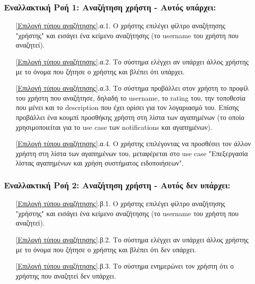 \documentclass[12pt,a4paper]{article}
\begin{document}
\subsubsection*{Εναλλακτική Ροή 1: Αναζήτηση χρήστη - Αυτός υπάρχει:}
\begin{enumerate}
    \item[\ref{Επιλογή τύπου αναζήτησης}.α.1.] Ο χρήστης επιλέγει φίλτρο αναζήτησης "χρήστης" και εισάγει ένα κείμενο αναζήτησης (το username του χρήστη που αναζητεί).
    \item[\ref{Επιλογή τύπου αναζήτησης}.α.2.] Το σύστημα ελέγχει αν υπάρχει άλλος χρήστης με το όνομα που ζήτησε ο χρήστης και βλέπει ότι υπάρχει.
    \item[\ref{Επιλογή τύπου αναζήτησης}.α.3.] Το σύστημα προβάλλει στον χρήστη το προφίλ του χρήστη που αναζήτησε, δηλαδή το username, το rating του, την τοποθεσία που μένει και το description που έχει ορίσει για τον λογαριασμό του. Επίσης προβάλλει ένα κουμπί προσθήκης χρήστη στη λίστα των αγαπημένων (το οποίο χρησιμοποιείται για το use case των notifications και αγαπημένων).
    \item[\ref{Επιλογή τύπου αναζήτησης}.α.4.] Ο χρήστης επιλέγοντας να προσθέσει τον άλλον χρήστη στη λίστα των αγαπημένων του, μεταφέρεται στο use case "Επεξεργασία λίστας αγαπημένων και χρήση συστήματος ειδοποιήσεων".
\end{enumerate}

\subsubsection*{Εναλλακτική Ροή 2: Αναζήτηση χρήστη - Αυτός δεν υπάρχει:}
\begin{enumerate}
    \item[\ref{Επιλογή τύπου αναζήτησης}.β.1.] Ο χρήστης επιλέγει φίλτρο αναζήτησης "χρήστης" και εισάγει ένα κείμενο αναζήτησης (το username του χρήστη που αναζητεί).
    \item[\ref{Επιλογή τύπου αναζήτησης}.β.2.] Το σύστημα ελέγχει αν υπάρχει άλλος χρήστης με το όνομα που ζήτησε ο χρήστης και βλέπει ότι δεν υπάρχει.
    \item[\ref{Επιλογή τύπου αναζήτησης}.β.3.] Το σύστημα ενημερώνει τον χρήστη ότι ο χρήστης που αναζητεί δεν υπάρχει.
\end{enumerate}
\end{document}
